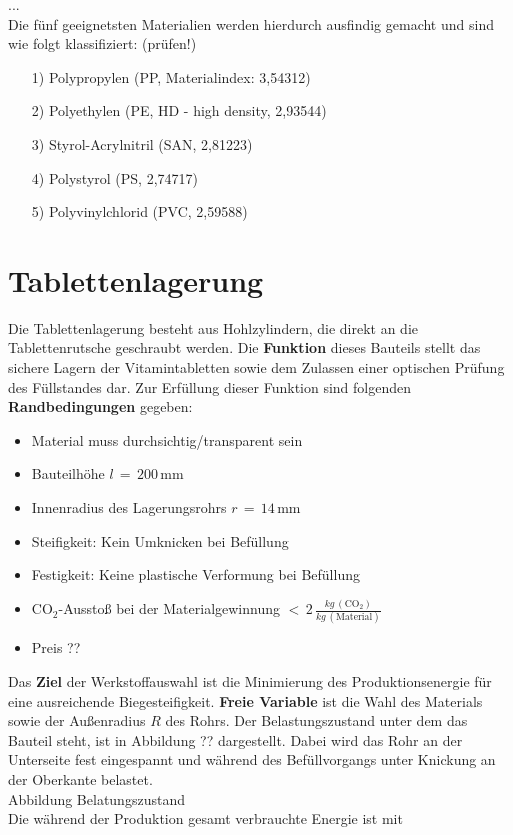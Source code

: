 ...\\
Die fünf geeignetsten Materialien werden hierdurch ausfindig gemacht und sind wie folgt klassifiziert: (prüfen!)
\begin{itemize}
	\item[1)] Polypropylen (PP, Materialindex: 3,54312)
	\item[2)] Polyethylen (PE, HD - high density, 2,93544)
	\item[3)] Styrol-Acrylnitril (SAN, 2,81223)
	\item[4)] Polystyrol (PS, 2,74717)
	\item[5)] Polyvinylchlorid (PVC, 2,59588)
\end{itemize}

\section{Tablettenlagerung}
Die Tablettenlagerung besteht aus Hohlzylindern, die direkt an die Tablettenrutsche geschraubt werden. Die \textbf{Funktion} dieses Bauteils stellt das sichere Lagern der Vitamintabletten sowie dem Zulassen einer optischen Prüfung des Füllstandes dar. Zur Erfüllung dieser Funktion sind folgenden \textbf{Randbedingungen} gegeben:
\begin{itemize}
	\item Material muss durchsichtig/transparent sein
	\item Bauteilhöhe $l\,=\,200\,$mm
	\item Innenradius des Lagerungsrohrs $r\,=\,14\,$mm
	\item Steifigkeit: Kein Umknicken bei Befüllung
	\item Festigkeit: Keine plastische Verformung bei Befüllung
	\item CO$_2$-Ausstoß bei der Materialgewinnung $<\,2\,\frac{kg\,(\text{CO}_2)}{kg\,(\text{Material})}$
	\item Preis ??
\end{itemize}
Das \textbf{Ziel} der Werkstoffauswahl ist die Minimierung des Produktionsenergie für eine ausreichende Biegesteifigkeit. \textbf{Freie Variable} ist die Wahl des Materials sowie der Außenradius $R$ des Rohrs. Der Belastungszustand unter dem das Bauteil steht, ist in Abbildung ?? dargestellt. Dabei wird das Rohr an der Unterseite fest eingespannt und während des Befüllvorgangs unter Knickung an der Oberkante belastet.\\
Abbildung Belatungszustand\\
Die während der Produktion gesamt verbrauchte Energie ist mit
